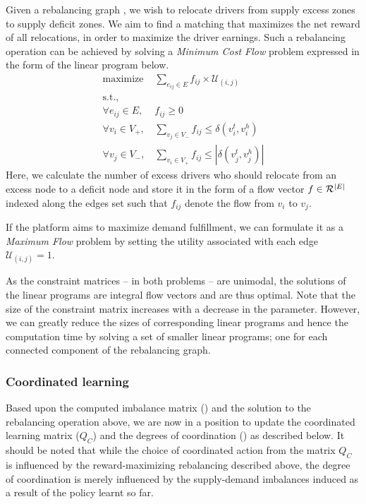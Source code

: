 Given a rebalancing graph {\rebalancinggraph}, we wish to relocate drivers from
    supply excess zones to supply deficit zones.  
We aim to find a matching that maximizes the net reward of all relocations, 
    in order to maximize the driver earnings.  
Such a rebalancing operation can be achieved by solving a
    \emph{Minimum Cost Flow} problem expressed in the form of the linear program below.
    \begin{eqnarray*}
        \text{maximize } &\sum_{e_{ij} \in E} f_{ij} \times \mathcal{U}_{(i,j)} \nonumber \\
        \text{s.t., }& \nonumber\\
        \forall e_{ij} \in E, &f_{ij} \geq 0 \nonumber\\
        \forall v_i \in V_+, &\sum_{v_j \in V_-} f_{ij} \leq \delta(v_i^t, v_i^h)
        \nonumber\\
        \forall v_j \in V_-, &\sum_{v_i \in V_+} f_{ij} \leq |\delta(v_j^t, v_j^h)|
    \end{eqnarray*}
\noindent Here, we calculate the number of
    excess drivers who should relocate from an excess node to a deficit node and store
    it in the form of a flow vector $f \in {{\ensuremath{\mathcal{R}}}}^{|E|}$ indexed along the
    edges set such that $f_{ij}$ denote the flow from $v_i$ to $v_j$. 

If the platform aims to maximize demand fulfillment, we can formulate it
    as a \emph{Maximum Flow} problem
by setting the utility associated with each edge 
    $\mathcal{U}_{(i,j)}=1$.

As the constraint matrices -- in both problems -- are unimodal, the solutions 
    of the linear programs are integral flow vectors and are thus optimal. 
Note that the size of the constraint matrix increases with a decrease in 
    the {\imbalancethreshold} parameter. 
However, we can greatly reduce the sizes of corresponding linear programs and 
    hence the computation time by solving a set of smaller linear programs; 
    one for each connected component of the rebalancing graph.

\subsubsection{Coordinated learning}
Based upon the computed imbalance matrix ({\imbalancematrix}) and the solution
    to the rebalancing operation above, we are now in a position to
    update the coordinated learning matrix ($Q_C$) and the degrees of coordination
    ({\coordination}) as described below.
It should be noted that while the choice of coordinated action from the matrix 
    $Q_C$ is
    influenced by the reward-maximizing rebalancing described above, the degree
    of coordination {\coordination} is merely influenced by the supply-demand
    imbalances induced as a result of the policy learnt so far.

